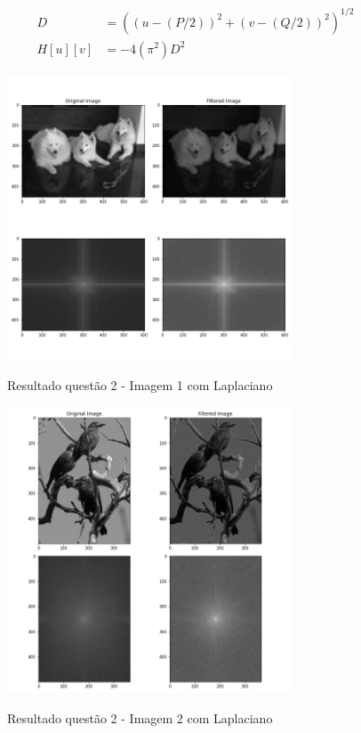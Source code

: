 \documentclass{article}
\begin{document}
\begin{align}
     D &= ((u - (P/2))^2 + (v - (Q/2))^2)^{1 / 2} \\
	H[u][v] &= - 4 (\pi^2) D^2
\end{align}

\begin{figure}[H]
	\label{fig: q2_1_laplace}
	\begin{minipage}[b]{1.0\linewidth}
		\centering
		\centerline{\includegraphics[width=8.5cm]{Figures/result2_1_laplace}}
		\centerline{Resultado questão 2 - Imagem 1 com Laplaciano}\medskip	
	\end{minipage}
\end{figure}

\begin{figure}[H]
	\label{fig: q2_2_laplace}
	\begin{minipage}[b]{1.0\linewidth}
		\centering
		\centerline{\includegraphics[width=8.5cm]{Figures/result2_2_laplace}}
		\centerline{Resultado questão 2 - Imagem 2 com Laplaciano}\medskip	
	\end{minipage}
\end{figure}
\end{document}
